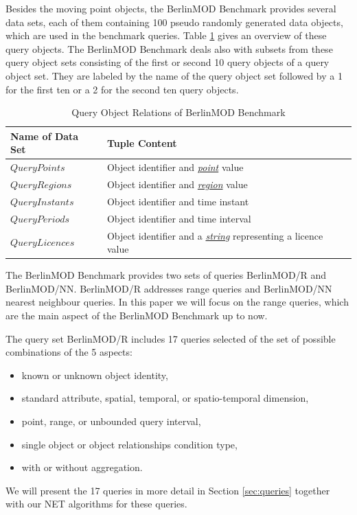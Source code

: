 \documentclass[a4paper]{article}
\newcommand{\bmodb} {BerlinMOD Benchmark}
\newcommand{\dt}[1]{\textsl{\underline{#1}}}
\begin{document}
Besides the moving point objects, the \bmodb{} provides several data sets, each
of them containing 100 pseudo randomly generated data objects, which are used in
the benchmark queries. Table \ref{tab:queryobjects} gives an overview of these
query objects. The \bmodb{} deals also with subsets from these query object
sets consisting of the first or second 10 query objects of a query object set.
They are labeled by the name of the query object set followed by a 1 for the
first ten or a 2 for the second ten query objects.

\begin{table}[H]
  \begin{tabularx}{1.0\textwidth}{|l|X|}
    \hline
    \textbf{Name of Data Set}&\textbf{Tuple Content}\\
    \hline
    $QueryPoints$&Object identifier and \dt{point} value\\
    \hline
    $QueryRegions$&Object identifier and \dt{region} value\\
    \hline
    $QueryInstants$&Object identifier and time instant\\
    \hline
    $QueryPeriods$&Object identifier and time interval\\
    \hline
    $QueryLicences$& Object identifier and a \dt{string} representing a licence value\\
    \hline
  \end{tabularx}
  \caption{Query Object Relations of \bmodb{}}
  \label{tab:queryobjects}
\end{table}

The \bmodb{} provides two sets of queries BerlinMOD/R and BerlinMOD/NN.
BerlinMOD/R addresses range queries and BerlinMOD/NN nearest neighbour queries.
In this paper we will focus on the range queries, which are the main aspect of the
\bmodb{} up to now.

The query set BerlinMOD/R includes 17 queries selected of the set of possible
combinations of the 5 aspects:
\begin{itemize}
  \item known or unknown object identity,
  \item standard attribute, spatial, temporal, or spatio-temporal dimension,
  \item point, range, or unbounded query interval,
  \item single object or object relationships condition type,
  \item with or without aggregation.
\end{itemize}
We will present the 17 queries in more detail in Section
\ref{sec:queries}
together with our NET algorithms for these queries.
\end{document}
